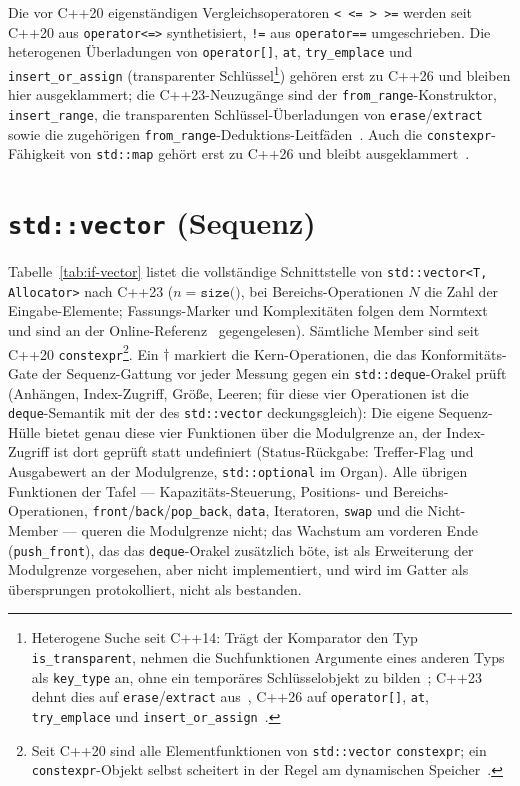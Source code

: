 \noindent Die vor C++20 eigenständigen Vergleichsoperatoren \texttt{<\,<=\,>\,>=} werden seit C++20 aus
\texttt{operator<=>} synthetisiert, \texttt{!=} aus \texttt{operator==} umgeschrieben. Die
heterogenen Überladungen von \texttt{operator[]}, \texttt{at}, \texttt{try\_emplace} und
\texttt{insert\_or\_assign} (transparenter Schlüssel\footnote{Heterogene Suche seit C++14: Trägt der
Komparator den Typ \texttt{is\_transparent}, nehmen die Suchfunktionen Argumente eines anderen Typs
als \texttt{key\_type} an, ohne ein temporäres Schlüsselobjekt zu
bilden~\cite{wakely2013heterogeneous}; C++23 dehnt dies auf \texttt{erase}/\texttt{extract}
aus~\cite{boyarinov2021erasure}, C++26 auf \texttt{operator[]}, \texttt{at}, \texttt{try\_emplace}
und \texttt{insert\_or\_assign}~\cite{boyarinov2023heterogeneous}.}) gehören erst zu C++26 und
bleiben hier ausgeklammert; die C++23-Neuzugänge sind der \texttt{from\_range}-Konstruktor,
\texttt{insert\_range}, die transparenten Schlüssel-Überladungen von
\texttt{erase}/\texttt{extract} sowie die zugehörigen
\texttt{from\_range}-Deduktions-Leitfäden~\cite{jabot2022ranges,boyarinov2021erasure}. Auch die
\texttt{constexpr}-Fähigkeit von \texttt{std::map} gehört erst zu C++26 und bleibt
ausgeklammert~\cite{cppreference_map}.

\section{\texttt{std::vector} (Sequenz)}\label{asec:if-vector}
Tabelle~\ref{tab:if-vector} listet die vollständige Schnittstelle von
\texttt{std::vector<T,\,Allocator>} nach C++23 ($n=\texttt{size()}$, bei Bereichs-Operationen $N$
die Zahl der Eingabe-Elemente; Fassungs-Marker und Komplexitäten folgen dem
Normtext~\cite{iso_cpp} und sind an der Online-Referenz~\cite{cppreference_vector} gegengelesen).
Sämtliche Member sind seit C++20 \texttt{constexpr}\footnote{Seit C++20 sind alle Elementfunktionen
von \texttt{std::vector} \texttt{constexpr}; ein \texttt{constexpr}-Objekt selbst scheitert in der
Regel am dynamischen Speicher~\cite{dionne2019constexprvector}.}. Ein $\dagger$ markiert die
Kern-Operationen, die das Konformitäts-Gate der Sequenz-Gattung vor jeder Messung gegen ein
\texttt{std::deque}-Orakel prüft (Anhängen, Index-Zugriff, Größe, Leeren; für diese vier
Operationen ist die \texttt{deque}-Semantik mit der des \texttt{std::vector} deckungsgleich): Die
eigene Sequenz-Hülle bietet genau diese vier Funktionen über die Modulgrenze an, der Index-Zugriff
ist dort geprüft statt undefiniert (Status-Rückgabe: Treffer-Flag und Ausgabewert an der
Modulgrenze, \texttt{std::optional} im Organ). Alle übrigen Funktionen der Tafel ---
Kapazitäts-Steuerung, Positions- und Bereichs-Operationen,
\texttt{front}/\texttt{back}/\texttt{pop\_back}, \texttt{data}, Iteratoren, \texttt{swap} und die
Nicht-Member --- queren die Modulgrenze nicht; das Wachstum am vorderen Ende
(\texttt{push\_front}), das das \texttt{deque}-Orakel zusätzlich böte, ist als Erweiterung der
Modulgrenze vorgesehen, aber nicht implementiert, und wird im Gatter als übersprungen protokolliert, nicht als bestanden.

